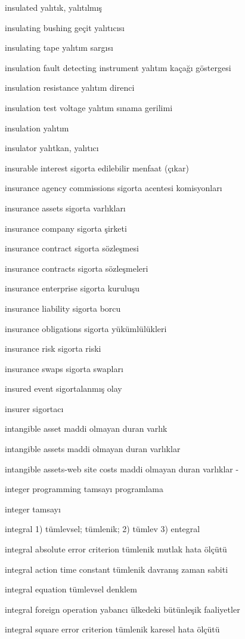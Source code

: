 \documentclass[12pt,fleqn]{article}\usepackage{../../common}
\begin{document}
insulated yalıtık, yalıtılmış

insulating bushing geçit yalıtıcısı

insulating tape yalıtım sargısı

insulation fault detecting instrument yalıtım kaçağı göstergesi

insulation resistance yalıtım direnci

insulation test voltage yalıtım sınama gerilimi

insulation yalıtım

insulator yalıtkan, yalıtıcı

insurable interest sigorta edilebilir menfaat (çıkar)

insurance agency commissions sigorta acentesi komisyonları

insurance assets sigorta varlıkları

insurance company sigorta şirketi

insurance contract sigorta sözleşmesi

insurance contracts sigorta sözleşmeleri

insurance enterprise sigorta kuruluşu

insurance liability sigorta borcu

insurance obligations sigorta yükümlülükleri

insurance risk sigorta riski

insurance swaps sigorta swapları

insured event sigortalanmış olay

insurer sigortacı

intangible asset maddi olmayan duran varlık

intangible assets maddi olmayan duran varlıklar

intangible assets-web site costs maddi olmayan duran varlıklar -

integer programming tamsayı programlama

integer tamsayı

integral 1) tümlevsel; tümlenik; 2) tümlev 3) entegral

integral absolute error criterion tümlenik mutlak hata ölçütü

integral action time constant tümlenik davranış zaman sabiti

integral equation tümlevsel denklem

integral foreign operation yabancı ülkedeki bütünleşik faaliyetler

integral square error criterion tümlenik karesel hata ölçütü
\end{document}
